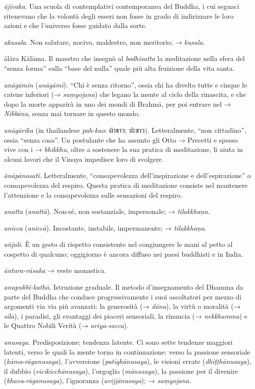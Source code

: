 \emph{ājīvaka}. Una scuola di contemplativi contemporanea del Buddha, i
cui seguaci ritenevano che la volontà degli esseri non fosse in grado di
indirizzare le loro azioni e che l'universo fosse guidato dalla sorte.

\emph{akusala}. Non salutare, nocivo, maldestro, non meritorio; →
\emph{kusala}.

ālāra Kālāma. Il maestro che insegnò al \emph{bodhisatta} la meditazione
nella sfera del ``senza forma'' sulla ``base del nulla'' quale più alta
fruizione della vita santa.

\emph{anāgāmin} (\emph{anāgāmī}). ``Chi è senza ritorno'', ossia chi ha
divelto tutte e cinque le catene inferiori (→ \emph{saṃyojana}) che
legano la mente al ciclo della rinascita, e che dopo la morte apparirà
in uno dei mondi di Brahmā, per poi entrare nel → \emph{Nibbāna}, senza
mai tornare in questo mondo.

\emph{anāgārika} (in thailandese \emph{pah-kao}: ผ้าขาว; ปะขาว).
Letteralmente, ``non cittadino'', ossia ``senza casa''. Un postulante
che ha assunto gli Otto → Precetti e spesso vive con i → \emph{bhikkhu},
oltre a sostenere la sua pratica di meditazione, li aiuta in alcuni
lavori che il Vinaya impedisce loro di svolgere.

\emph{ānāpānasati}. Letteralmente, ``consapevolezza dell'inspirazione e
dell'espirazione'' o consapevolezza del respiro. Questa pratica di
meditazione consiste nel mantenere l'attenzione e la consapevolezza
sulle sensazioni del respiro.

\emph{anatta} (\emph{anattā}). Non-sé, non sostanziale, impersonale; →
\emph{tilakkhaṇa}.

\emph{anicca} (\emph{aniccā}). Incostante, instabile, impermanente; →
\emph{tilakkhaṇa}.

\emph{añjali}. È un gesto di rispetto consistente nel congiungere le
mani al petto al cospetto di qualcuno; oggigiorno è ancora diffuso nei
paesi buddhisti e in India.

\emph{āntara-vāsaka} → veste monastica.

\emph{anupubbī-kathā}. Istruzione graduale. Il metodo d'insegnamento del
Dhamma da parte del Buddha che conduce progressivamente i suoi
ascoltatori per mezzo di argomenti via via più avanzati: la generosità
(→ \emph{dāna}), la virtù o moralità (→ \emph{sīla}), i paradisi, gli
svantaggi dei piaceri sensoriali, la rinuncia (→ \emph{nekkhamma}) e le
Quattro Nobili Verità (→ \emph{ariya-sacca}).

\emph{anusaya}. Predisposizione; tendenza latente. Ci sono sette
tendenze maggiori latenti, verso le quali la mente torna in
continuazione: verso la passione sensoriale
(\emph{kāma}-\emph{rāganusaya}), l'avversione (\emph{patīghānusaya}),
le visioni errate (\emph{dhiṭṭhānusaya}), il dubbio
(\emph{vicikicchānusaya}), l'orgoglio (\emph{mānusaya}), la passione
per il divenire (\emph{bhava}-\emph{rāganusaya}), l'ignoranza
(\emph{avijjānusaya}); → \emph{saṃyojana.}


